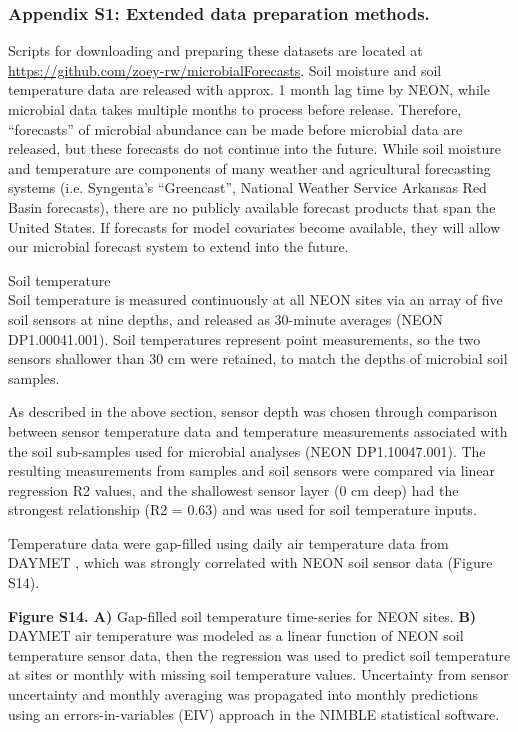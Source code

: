 \documentclass[11pt]{article}
\begin{document}
\subsubsection{Appendix S1: Extended data preparation methods.}

Scripts for downloading and preparing these datasets are located at \url{https://github.com/zoey-rw/microbialForecasts}. Soil moisture and soil temperature data are released with approx. 1 month lag time by NEON, while microbial data takes multiple months to process before release. Therefore, “forecasts” of microbial abundance can be made before microbial data are released, but these forecasts do not continue into the future. While soil moisture and temperature are components of many weather and agricultural forecasting systems (i.e. Syngenta’s “Greencast”, National Weather Service Arkansas Red Basin forecasts), there are no publicly available forecast products that span the United States. If forecasts for model covariates become available, they will allow our microbial forecast system to extend into the future.

Soil temperature \\
Soil temperature is measured continuously at all NEON sites via an array of five soil sensors at nine depths, and released as 30-minute averages (NEON DP1.00041.001). Soil temperatures represent point measurements, so the two sensors shallower than 30 cm were retained, to match the depths of microbial soil samples. 

As described in the above section, sensor depth was chosen through comparison between sensor temperature data and temperature measurements associated with the soil sub-samples used for microbial analyses (NEON DP1.10047.001). The resulting measurements from samples and soil sensors were compared via linear regression R2 values, and the shallowest sensor layer (0 cm deep) had the strongest relationship (R2 = 0.63) and was used for soil temperature inputs. 

Temperature data were gap-filled using daily air temperature data from DAYMET \cite{thornton_daymet_2020}, which was strongly correlated with NEON soil sensor data (Figure S14).

\textbf{Figure S14. A)} Gap-filled soil temperature time-series for NEON sites. \textbf{B)} DAYMET air temperature was modeled as a linear function of NEON soil temperature sensor data, then the regression was used to predict soil temperature at sites or monthly with missing soil temperature values. Uncertainty from sensor uncertainty and monthly averaging was propagated into monthly predictions using an errors-in-variables (EIV) approach in the NIMBLE statistical software.
\end{document}
